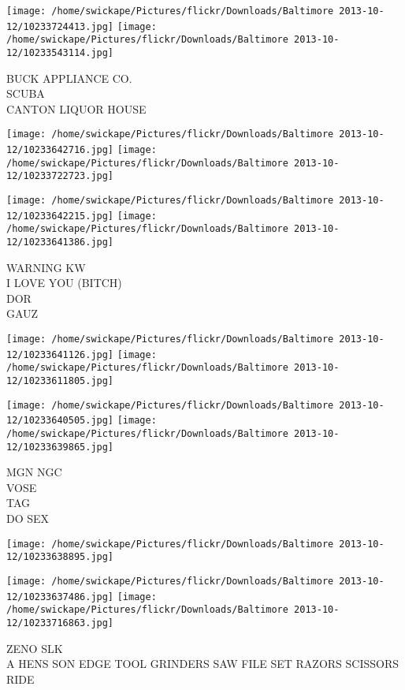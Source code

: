 \documentclass[10pt,letterpaper]{article}
\begin{document}
\vspace{0.25in}
\texttt{[image: /home/swickape/Pictures/flickr/Downloads/Baltimore 2013-10-12/10233724413.jpg]}
\texttt{[image: /home/swickape/Pictures/flickr/Downloads/Baltimore 2013-10-12/10233543114.jpg]}

BUCK APPLIANCE CO.\\
SCUBA\\
CANTON LIQUOR HOUSE
\pagebreak

\texttt{[image: /home/swickape/Pictures/flickr/Downloads/Baltimore 2013-10-12/10233642716.jpg]}
\texttt{[image: /home/swickape/Pictures/flickr/Downloads/Baltimore 2013-10-12/10233722723.jpg]}

\texttt{[image: /home/swickape/Pictures/flickr/Downloads/Baltimore 2013-10-12/10233642215.jpg]}
\texttt{[image: /home/swickape/Pictures/flickr/Downloads/Baltimore 2013-10-12/10233641386.jpg]}

WARNING KW\\
I LOVE YOU (BITCH)\\
DOR\\
GAUZ
\pagebreak

\texttt{[image: /home/swickape/Pictures/flickr/Downloads/Baltimore 2013-10-12/10233641126.jpg]}
\texttt{[image: /home/swickape/Pictures/flickr/Downloads/Baltimore 2013-10-12/10233611805.jpg]}

\texttt{[image: /home/swickape/Pictures/flickr/Downloads/Baltimore 2013-10-12/10233640505.jpg]}
\texttt{[image: /home/swickape/Pictures/flickr/Downloads/Baltimore 2013-10-12/10233639865.jpg]}

MGN NGC\\
VOSE\\
TAG\\
DO SEX
\pagebreak

\texttt{[image: /home/swickape/Pictures/flickr/Downloads/Baltimore 2013-10-12/10233638895.jpg]}

\vspace{0.25in}
\texttt{[image: /home/swickape/Pictures/flickr/Downloads/Baltimore 2013-10-12/10233637486.jpg]}
\texttt{[image: /home/swickape/Pictures/flickr/Downloads/Baltimore 2013-10-12/10233716863.jpg]}

ZENO SLK\\
A HENS SON EDGE TOOL GRINDERS SAW FILE SET RAZORS SCISSORS\\
RIDE
\pagebreak
\end{document}
